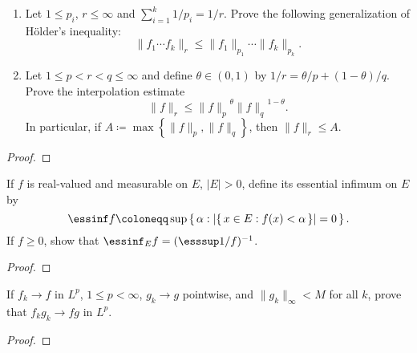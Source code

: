 \begin{problem}
\begin{enumerate}[label=(\alph*)]
\item Let $1\leq p_i$, $r\leq\infty$ and $\sum_{i=1}^k1/p_i=1/r$. Prove the
  following generalization of Hölder's inequality:
\[
\|f_1\dotsm f_k\|_r\leq\|f_1\|_{p_1}\dotsm\|f_k\|_{p_k}.
\]
\item Let $1\leq p<r<q\leq\infty$ and define $\theta\in(0,1)$ by
  $1/r=\theta/p+(1-\theta)/q$. Prove the interpolation estimate
\[
\|f\|_r\leq{\|f\|_p}^\theta{\|f\|_q}^{1-\theta}.
\]
In particular, if $A\coloneqq\max\left\{\|f\|_p,\|f\|_q\right\}$, then
$\|f\|_r\leq A$.
\end{enumerate}
\end{problem}
\begin{proof}
\end{proof}
\newpage

\begin{problem}
If $f$ is real-valued and measurable on $E$, $|E|>0$, define its essential
infimum on $E$ by
\[
\essinf f\coloneqq\sup\left\{\,\alpha:\left|\{\,x\in
    E:f(x)<\alpha\,\}\right|=0\,\right\}.
\]
If $f\geq 0$, show that $\essinf_E f=(\esssup 1/f)^{-1}$.
\end{problem}
\begin{proof}
\end{proof}
\newpage

\begin{problem}
If $f_k\to f$ in $L^p$, $1\leq p<\infty$, $g_k\to g$ pointwise, and
$\|g_k\|_\infty<M$ for all $k$, prove that $f_kg_k\to fg$ in $L^p$.
\end{problem}
\begin{proof}
\end{proof}


